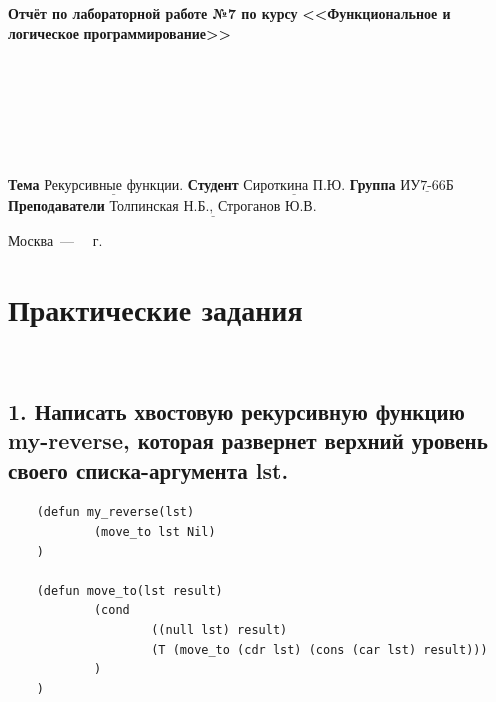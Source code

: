 \documentclass[12pt]{report}
\begin{document}
\begin{titlepage}
	
	\begin{center}
		\noindent\begin{minipage}{1.3\textwidth}\centering
			\Large\textbf{  Отчёт по лабораторной работе №7 по курсу}\newline\newline
			\textbf{<<Функциональное и логическое}\newline
			\textbf{\indent\indent\indent программирование>>}\newline
		\end{minipage}
	\end{center}
	
	~\\\\\\\\\\\\
	\large
	\noindent\textbf{Тема } $\underline{\text{Рекурсивные функции.}}$\newline\newline
	\noindent\textbf{Студент } $\underline{\text{Сироткина П.Ю.}}$\newline\newline
	\noindent\textbf{Группа } $\underline{\text{ИУ7-66Б}}$\newline\newline
	\noindent\textbf{Преподаватели } $\underline{\text{Толпинская Н.Б., Строганов Ю.В.}}$\newline\newline\newline
	
	\begin{center}
		\vfill
		Москва~---~\the\year
		~г.
	\end{center}
\end{titlepage}

\chapter*{Практические задания}

~\

\section*{1. Написать хвостовую рекурсивную функцию my-reverse, которая развернет верхний уровень своего списка-аргумента lst.}

\begin{lstlisting}
	(defun my_reverse(lst)
			(move_to lst Nil)
	)
	
	(defun move_to(lst result)
			(cond
					((null lst) result)
					(T (move_to (cdr lst) (cons (car lst) result)))
			)
	)
\end{lstlisting}
\end{document}
